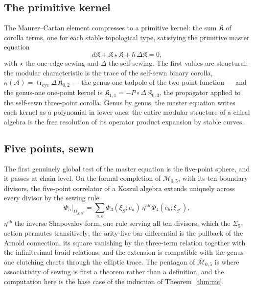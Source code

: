 \documentclass[11pt]{amsart}
\numberwithin{equation}{section}
\theoremstyle{plain}
\theoremstyle{definition}
\theoremstyle{remark}
\newcommand{\cA}{\mathcal{A}}
\newcommand{\cM}{\mathcal{M}}
\newcommand{\Mbar}{\overline{\cM}}
\begin{document}
\subsection{The primitive kernel}

The Maurer--Cartan element compresses to a primitive kernel: the sum
$\mathfrak{K}$ of corolla terms, one for each stable topological
type, satisfying the primitive master equation
\begin{equation}
d\mathfrak{K}+\mathfrak{K}\star\mathfrak{K}
+\hbar\,\Delta\mathfrak{K}=0,
\end{equation}
with $\star$ the one-edge sewing and $\Delta$ the self-sewing. The
first values are structural: the modular characteristic is the trace
of the self-sewn binary corolla,
$\kappa(\cA)=\operatorname{tr}_{\mathrm{cyc}}\Delta\,
\mathfrak{K}_{0,2}$ --- the genus-one tadpole of the two-point
function --- and the genus-one one-point kernel is
$\mathfrak{K}_{1,1}=-P\circ\Delta\,\mathfrak{K}_{0,3}$, the
propagator applied to the self-sewn three-point corolla. Genus by
genus, the master equation writes each kernel as a polynomial in
lower ones: the entire modular structure of a chiral algebra is the
free resolution of its operator product expansion by stable curves.

\subsection{Five points, sewn}

The first genuinely global test of the master equation is the
five-point sphere, and it passes at chain level. On the formal
completion of $\Mbar_{0,5}$, with its ten boundary divisors, the
five-point correlator of a Koszul algebra extends uniquely across
every divisor by the sewing rule
\begin{equation}
\Phi_5\big|_{D_{S,S^{c}}}
=\sum_{a,b}\Phi_3(\xi_S;e_a)\,\eta^{ab}\,\Phi_4(e_b;\xi_{S^{c}}),
\end{equation}
$\eta^{ab}$ the inverse Shapovalov form, one rule serving all ten
divisors, which the $\Sigma_5$-action permutes transitively; the
arity-five bar
differential is the pullback of the Arnold connection, its square
vanishing by the three-term relation together with the infinitesimal
braid relations; and the extension is compatible with the genus-one
clutching charts through the elliptic trace. The pentagon of
$\Mbar_{0,5}$ is where associativity of sewing is first a theorem
rather than a definition, and the computation here is the base case
of the induction of Theorem~\ref{thm:mc}.
\end{document}
